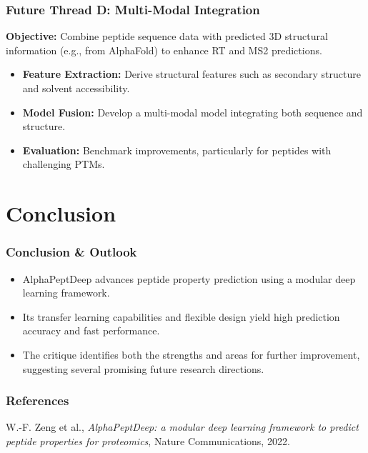 \documentclass{beamer}
\begin{document}
\begin{frame}
  \frametitle{Future Thread D: Multi-Modal Integration}
  \textbf{Objective:} Combine peptide sequence data with predicted 3D structural information (e.g., from AlphaFold) to enhance RT and MS2 predictions.
  \begin{itemize}
    \item \textbf{Feature Extraction:} Derive structural features such as secondary structure and solvent accessibility.
    \item \textbf{Model Fusion:} Develop a multi-modal model integrating both sequence and structure.
    \item \textbf{Evaluation:} Benchmark improvements, particularly for peptides with challenging PTMs.
  \end{itemize}
\end{frame}

\section{Conclusion}
\begin{frame}
  \frametitle{Conclusion \& Outlook}
  \begin{itemize}
    \item AlphaPeptDeep advances peptide property prediction using a modular deep learning framework.
    \item Its transfer learning capabilities and flexible design yield high prediction accuracy and fast performance.
    \item The critique identifies both the strengths and areas for further improvement, suggesting several promising future research directions.
  \end{itemize}
\end{frame}

\begin{frame}
  \frametitle{References}
  \footnotesize{
  \begin{thebibliography}{1}
    W.-F. Zeng et al., \emph{AlphaPeptDeep: a modular deep learning framework to predict peptide properties for proteomics}, Nature Communications, 2022.
  \end{thebibliography}
  }
\end{frame}
\end{document}
